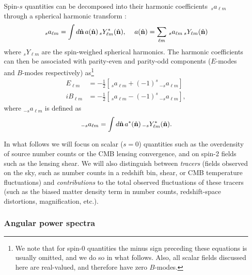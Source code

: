 \documentclass[\docopts]{\docclass}
\newcommand{\nv}{\hat{\bf n}}
\begin{document}
Spin-$s$ quantities can be decomposed into their harmonic coefficients $\,_sa_{\ell m}$ through a spherical harmonic transform \citep{1997PhRvD..55.1830Z,2011A&A...526A.108R}:
\begin{equation}\nonumber
  \,_sa_{\ell m}=\int d\nv\,a(\nv)\,_sY^*_{\ell m}(\nv),\hspace{12pt}
  a(\nv)=\sum_{\ell m}\,_sa_{\ell m}\,_sY_{\ell m}(\nv)
\end{equation}
where $_sY_{\ell m}$ are the spin-weighed spherical harmonics. The harmonic coefficients can then be associated with parity-even and parity-odd components ($E$-modes and $B$-modes respectively) as\footnote{We note that for spin-$0$ quantities the minus sign preceding these equations is usually omitted, and we do so in what follows. Also, all scalar fields discussed here are real-valued, and therefore have zero $B$-modes.}
\begin{align}\nonumber
   E_{\ell m}&=-\frac{1}{2}\left[\,_{s}a_{\ell m}+(-1)^s\,_{-s}a_{\ell m}\right]\\
  iB_{\ell m}&=-\frac{1}{2}\left[\,_{s}a_{\ell m}-(-1)^s\,_{-s}a_{\ell m}\right],
\end{align}
where $_{-s}a_{\ell m}$ is defined as
\begin{equation}\nonumber
  \,_{-s}a_{\ell m}=\int d\nv\,a^*(\nv)\,_{-s}Y^*_{\ell m}(\nv).
\end{equation}

In what follows we will focus on scalar ($s=0$) quantities such as the overdensity of source number counts or the CMB lensing convergence, and on spin-2 fields such as the lensing shear. We will also distinguish between {\sl tracers} (fields observed on the sky, such as number counts in a redshift bin, shear, or CMB temperature fluctuations) and {\sl contributions} to the total observed fluctuations of these tracers (such as the biased matter density term in number counts, redshift-space distortions, magnification, etc.).

\subsubsection{Angular power spectra}\label{sssec:2pt.pspec}
\end{document}
